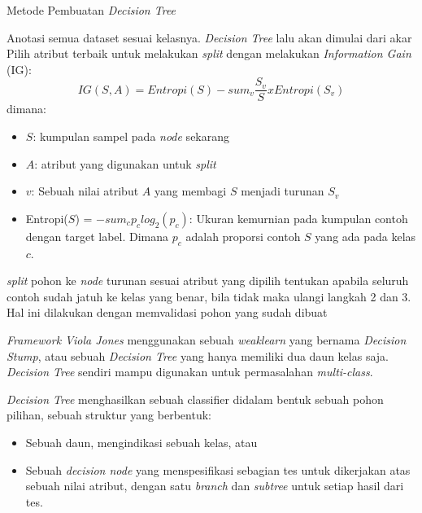 \begin{algorithm}
  \caption{Metode Pembuatan \textit{Decision Tree}}
  \begin{algorithmic} [1]
    \State Anotasi semua dataset sesuai kelasnya. \textit{Decision Tree} lalu 
    akan dimulai dari akar
    \State Pilih atribut terbaik untuk melakukan \textit{split} dengan melakukan 
    \emph{Information Gain} (IG):
    \begin{equation}
      IG(S, A) = Entropi(S) - sum_v \frac{S_v}{S} x Entropi(S_v)
    \end{equation} 
    dimana:
    \begin{itemize}
      \item $S$: kumpulan sampel pada \emph{node} sekarang
      \item $A$: atribut yang digunakan untuk \textit{split}
      \item $v$: Sebuah nilai atribut $A$ yang membagi $S$ menjadi turunan $S_v$
      \item Entropi($S$) = $-sum_c p_c log_2(p_c)$: Ukuran kemurnian pada kumpulan 
      contoh dengan target label. Dimana $p_c$ adalah proporsi contoh $S$ yang ada 
      pada kelas $c$. 
    \end{itemize}
    \State \textit{split} pohon ke \textit{node} turunan sesuai atribut yang dipilih 
    \State tentukan apabila seluruh contoh sudah jatuh ke kelas yang benar, bila tidak 
    maka ulangi langkah 2 dan 3. Hal ini dilakukan dengan memvalidasi pohon  yang 
    sudah dibuat
  \end{algorithmic}
\end{algorithm}

\emph{Framework Viola Jones} menggunakan sebuah \emph{weaklearn} yang bernama 
\emph{Decision Stump}, atau sebuah \emph{Decision Tree} yang hanya memiliki 
dua daun kelas saja. \emph{Decision Tree} sendiri mampu digunakan untuk 
permasalahan \emph{multi-class}.

\emph{Decision Tree} menghasilkan sebuah classifier didalam bentuk sebuah pohon 
pilihan, sebuah struktur yang berbentuk:
\begin{itemize}
  \item Sebuah daun, mengindikasi sebuah kelas, atau
  \item Sebuah \emph{decision node} yang menspesifikasi 
  sebagian tes untuk dikerjakan atas sebuah nilai 
  atribut, dengan satu \emph{branch} dan \emph{subtree} untuk 
  setiap hasil dari tes.
\end{itemize}

